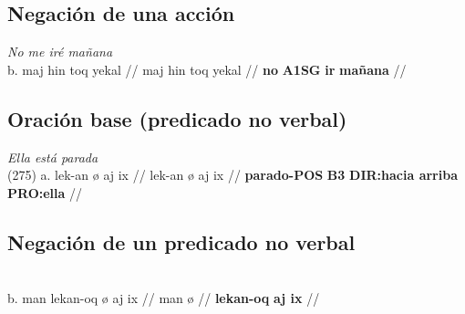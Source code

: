 \documentclass{article}%
\begin{document}
\subsection{Negación de una acción}%
\label{subsec:Negacindeunaaccin}%

%
\par\medskip%
\ex
\textit{No me iré mañana} \\
\begingl
\gla b. maj hin toq yekal //
\glb maj hin toq yekal //
\glc \textbf{no} \textbf{A1SG} \textbf{ir} \textbf{mañana} //
\endgl
\xe
%
\medskip%
\subsection{Oración base (predicado no verbal)}%
\label{subsec:Oracinbase(predicadonoverbal)}%

%
\par\medskip%
\ex
\textit{Ella está parada} \\
\begingl
\gla (275) a. lek-an ø aj ix //
\glb lek-an ø aj ix //
\glc \textbf{parado-POS} \textbf{B3} \textbf{DIR:hacia arriba} \textbf{PRO:ella} //
\endgl
\xe
%
\medskip%
\subsection{Negación de un predicado no verbal}%
\label{subsec:Negacindeunpredicadonoverbal}%

%
\par\medskip%
\ex
\textit{} \\
\begingl
\gla b. man lekan-oq ø aj ix //
\glb man ø //
\glc \textbf{lekan-oq} \textbf{aj ix} //
\endgl
\xe
%
\medskip

%
\end{document}

